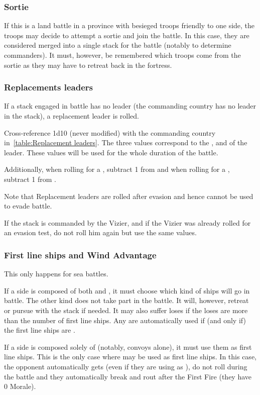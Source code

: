 \subsubsection{Sortie}
If this is a land battle in a province with besieged troops friendly to one
side, the troops may decide to attempt a sortie and join the battle. In this
case, they are considered merged into a single stack for the battle (notably
to determine commanders). It must, however, be remembered which troops come
from the sortie as they may have to retreat back in the fortress.

\subsubsection{Replacements leaders}
If a stack engaged in battle has no leader (the commanding country has no
leader in the stack), a replacement leader is rolled.


Cross-reference 1d10 (never modified) with the commanding country
in~\ref{table:Replacement leaders}. The three values correspond to the \Man,
\Fire and \Shock of the leader. These values will be used for the whole
duration of the battle.

Additionally, when rolling for a \POL \LeaderA, subtract 1 from \Man and when
rolling for a \PRU \LeaderA, subtract 1 from \Fire.

Note that Replacement leaders are rolled after evasion and hence cannot be
used to evade battle.

If the stack is commanded by the \TUR Vizier, and if the Vizier was already
rolled for an evasion test, do not roll him again but use the same values.

\subsubsection{First line ships and Wind Advantage}
This only happens for sea battles.

If a side is composed of both \NGD and \NWD, it must choose which kind of
ships will go in battle. The other kind does not take part in the battle. It
will, however, retreat or pursue with the stack if needed. It may also suffer
loses if the loses are more than the number of first line ships. Any \VGD are
automatically used if (and only if) the first line ships are \NGD.

If a side is composed solely of \NTD (notably, convoys alone), it must use
them as first line ships. This is the only case where \NTD may be used as
first line ships. In this case, the opponent automatically gets  (even if they are using \NGD as ), \NTD
do not roll during the battle and they automatically break and rout after the
First Fire (they have 0 Morale).

